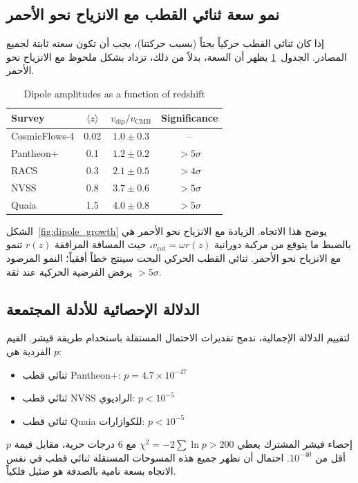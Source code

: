 \documentclass[12pt,a4paper]{article}
\begin{document}
	\subsection{نمو سعة ثنائي القطب مع الانزياح نحو الأحمر}
	
	إذا كان ثنائي القطب حركياً بحتاً (بسبب حركتنا)، يجب أن تكون سعته ثابتة لجميع المصادر. الجدول~\ref{tab:dipole_amplitudes} يظهر أن السعة، بدلاً من ذلك، تزداد بشكل ملحوظ مع الانزياح نحو الأحمر.
	
	\begin{otherlanguage}{english}
		\begin{table}[htbp]
			\centering
			\caption{Dipole amplitudes as a function of redshift}
			\label{tab:dipole_amplitudes}
			\begin{tabular}{lccc}
				\toprule
				\textbf{Survey} & \(\langle z \rangle\) & \(v_{\text{dip}}/v_{\text{CMB}}\) & \textbf{Significance} \\
				\midrule
				CosmicFlows-4 & 0.02 & \(1.0 \pm 0.3\) & -- \\
				Pantheon+ & 0.1 & \(1.2 \pm 0.2\) & \(>5\sigma\) \cite{Sah2025} \\
				RACS & 0.3 & \(2.1 \pm 0.5\) & \(>4\sigma\) \cite{Oayda2024} \\
				NVSS & 0.8 & \(3.7 \pm 0.6\) & \(>5\sigma\) \cite{Singal2024} \\
				Quaia & 1.5 & \(4.0 \pm 0.8\) & \(>5\sigma\) \cite{Secrest2025} \\
				\bottomrule
			\end{tabular}
		\end{table}
	\end{otherlanguage}
	
	\noindent الشكل~\ref{fig:dipole_growth} يوضح هذا الاتجاه. الزيادة مع الانزياح نحو الأحمر هي بالضبط ما يتوقع من مركبة دورانية \(v_{\mathrm{rot}} = \omega r(z)\)، حيث المسافة المرافقة \(r(z)\) تنمو مع الانزياح نحو الأحمر. ثنائي القطب الحركي البحت سينتج خطاً أفقياً؛ النمو المرصود يرفض الفرضية الحركية عند ثقة \(>5\sigma\).
	
	\subsection{الدلالة الإحصائية للأدلة المجتمعة}
	
	لتقييم الدلالة الإجمالية، ندمج تقديرات الاحتمال المستقلة باستخدام طريقة فيشر. القيم \(p\) الفردية هي:
	\begin{itemize}
		\item ثنائي قطب Pantheon+: \(p = 4.7\times10^{-47}\) \cite{Sah2025}
		\item ثنائي قطب NVSS الراديوي: \(p < 10^{-5}\) \cite{Singal2024}
		\item ثنائي قطب Quaia للكوازارات: \(p < 10^{-5}\) \cite{Secrest2025}
	\end{itemize}
	إحصاء فيشر المشترك يعطي \(\chi^2 = -2\sum \ln p > 200\) مع 6 درجات حرية، مقابل قيمة \(p\) أقل من \(10^{-40}\). احتمال أن تظهر جميع هذه المسوحات المستقلة ثنائي قطب في نفس الاتجاه بسعة نامية بالصدفة هو ضئيل فلكياً.
	
\end{document}
